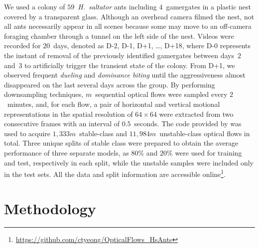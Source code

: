 \documentclass[letterpaper]{article} %
\begin{document}
We used a colony of $59$~\emph{H.~saltator} ants including $4$~gamergates
in a plastic nest covered by a transparent glass. Although an overhead camera
filmed the nest, not all ants necessarily appear in all scenes because some may
move to an off-camera foraging chamber through a tunnel on the left side
of the nest.
Videos were recorded for $20$~days, denoted as D-2, D-1, D+1,
\dots, D+18, where D-0 represents the instant of removal of the previously
identified gamergates between days~$2$ and~$3$ to artificially trigger
the transient state of the colony. From D+1, we observed frequent
\emph{dueling} and \emph{dominance biting} until the aggressiveness
almost disappeared on the last several days across the group. By
performing downsampling techniques, $m$~sequential optical flows were
sampled every $2$~minutes, and, for each flow, a pair of horizontal and
vertical motional representations in the spatial resolution of $64
\times 64$ were extracted from two consecutive frames with an interval
of $0.5$~seconds. The code provided by \citet{WXWQLTV16} was used to
acquire $1,333m$~stable-class and $11,984m$~unstable-class optical flows
in total. Three unique splits of stable class were prepared to obtain
the average performance of three separate models, as $80\%$ and $20\%$
were used for training and test, respectively in each split, while the
unstable samples were included only in the test sets. All the data and
split information are accessible
online\footnote{\url{https://github.com/ctyeong/OpticalFlows_HsAnts}}.

\section{Methodology}
\label{sec:method}
\end{document}
